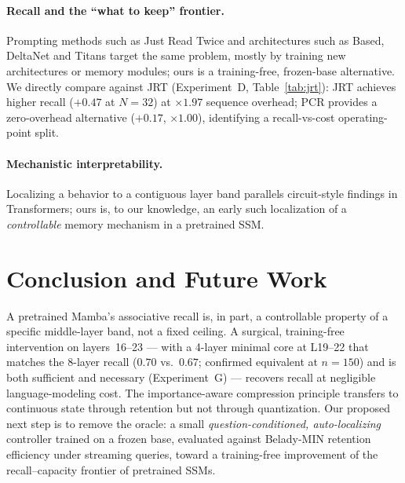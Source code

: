 \documentclass{article}
\begin{document}
\paragraph{Recall and the ``what to keep'' frontier.}
Prompting methods such as Just Read Twice \citep{jrt} and architectures such as
Based, DeltaNet and Titans \citep{titans} target the same problem, mostly by
training new architectures or memory modules; ours is a training-free,
frozen-base alternative. We directly compare against JRT (Experiment~D,
Table~\ref{tab:jrt}): JRT achieves higher recall ($+0.47$ at $N{=}32$) at
$\times 1.97$ sequence overhead; PCR provides a zero-overhead alternative
($+0.17$, $\times 1.00$), identifying a recall-vs-cost operating-point split.
\paragraph{Mechanistic interpretability.}
Localizing a behavior to a contiguous layer band parallels circuit-style findings
in Transformers; ours is, to our knowledge, an early such localization of a
\emph{controllable} memory mechanism in a pretrained SSM.

\section{Conclusion and Future Work}
A pretrained Mamba's associative recall is, in part, a controllable property of a
specific middle-layer band, not a fixed ceiling. A surgical, training-free
intervention on layers~16--23 --- with a 4-layer minimal core at L19--22 that
matches the 8-layer recall ($0.70$ vs.\ $0.67$; confirmed equivalent at $n{=}150$)
and is both sufficient and necessary (Experiment~G) --- recovers
recall at negligible language-modeling cost. The importance-aware compression principle transfers to continuous state
through retention but not through quantization. Our proposed next step is to
remove the oracle: a small \emph{question-conditioned, auto-localizing} controller
trained on a frozen base, evaluated against Belady-MIN retention efficiency under
streaming queries, toward a training-free improvement of the recall--capacity
frontier of pretrained SSMs.
\end{document}
